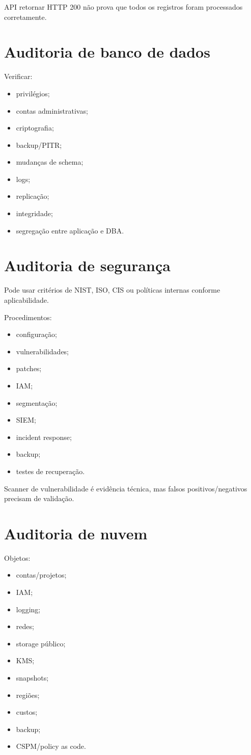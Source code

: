 API retornar HTTP 200 não prova que todos os registros foram processados corretamente.

\section{Auditoria de banco de dados}

Verificar:
\begin{itemize}
\item privilégios;
\item contas administrativas;
\item criptografia;
\item backup/PITR;
\item mudanças de schema;
\item logs;
\item replicação;
\item integridade;
\item segregação entre aplicação e DBA.
\end{itemize}

\section{Auditoria de segurança}

Pode usar critérios de NIST, ISO, CIS ou políticas internas conforme aplicabilidade.

Procedimentos:
\begin{itemize}
\item configuração;
\item vulnerabilidades;
\item patches;
\item IAM;
\item segmentação;
\item SIEM;
\item incident response;
\item backup;
\item testes de recuperação.
\end{itemize}

Scanner de vulnerabilidade é evidência técnica, mas falsos positivos/negativos precisam de validação.

\section{Auditoria de nuvem}

Objetos:
\begin{itemize}
\item contas/projetos;
\item IAM;
\item logging;
\item redes;
\item storage público;
\item KMS;
\item snapshots;
\item regiões;
\item custos;
\item backup;
\item CSPM/policy as code.
\end{itemize}

